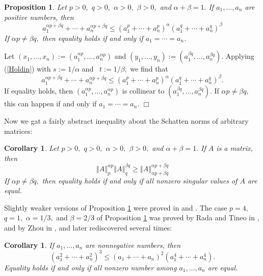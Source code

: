 \documentclass[12pt]{article}%
\newtheorem{corollary}[theorem]{Corollary}
\newtheorem{proposition}[theorem]{Proposition}
\newenvironment{proof}[1][Proof]{\noindent{\textbf {#1}  }}  {\hfill$\Box$\bigskip}
\begin{document}
\begin{proposition}
\label{proP}Let $p>0,$ $q>0,$ $\alpha>0,$ $\beta>0,$ and $\alpha+\beta=1.$ If
$a_{1},\ldots,a_{n}$ are positive numbers, then%
\[
a_{1}^{\alpha p+\beta q}+\cdots+a_{n}^{\alpha p+\beta q}\leq\left(  a_{1}%
^{p}+\cdots+a_{n}^{p}\right)  ^{\alpha}\left(  a_{1}^{q}+\cdots+a_{n}%
^{q}\right)  ^{\beta}%
\]
If $\alpha p\neq\beta q,$ then equality holds if and only if $a_{1}%
=\cdots=a_{n}$.
\end{proposition}

\begin{proof}
Let $\left(  x_{1},\ldots,x_{n}\right)  :=\left(  a_{1}^{\alpha p}%
,\ldots,a_{n}^{\alpha p}\right)  $ and $\left(  y_{1},\ldots,y_{n}\right)
:=(a_{1}^{\beta q},\ldots,a_{n}^{\beta q}).$ Applying (\ref{Holdin}) with
$s:=1/\alpha$ and \ $t:=1/\beta,$ we find that%
\[
a_{1}^{\alpha p+\beta q}+\cdots+a_{n}^{\alpha p+\beta q}\leq\left(  a_{1}%
^{p}+\cdots+a_{n}^{p}\right)  ^{\alpha}\left(  a_{1}^{q}+\cdots+a_{n}%
^{q}\right)  ^{\beta}.
\]
If equality holds, then $\left(  a_{1}^{\alpha p},\ldots,a_{n}^{\alpha
p}\right)  $ is collinear to $(a_{1}^{\beta q},\ldots,a_{n}^{\beta q}).$ If
$\alpha p\neq\beta q,$ this can happen if and only if $a_{1}=\cdots=a_{n}.$
\end{proof}

Now we gat a fairly abstract inequality about the Schatten norms of arbitrary matrices:

\begin{corollary}
\label{proPP}Let $p>0,$ $q>0,$ $\alpha>0,$ $\beta>0,$ and $\alpha+\beta=1.$ If
$A$ is a matrix, then
\[
\left\Vert A\right\Vert _{p}^{\alpha p}\left\Vert A\right\Vert _{q}^{\beta
q}\geq\left\Vert A\right\Vert _{\alpha p+\beta q}^{\alpha p+\beta q}%
\]
If $\alpha p\neq\beta q,$ then equality holds if and only if all nonzero
singular values of $A$ are equal.
\end{corollary}

Slightly weaker versions of Proposition \ref{proP} were proved in \cite{PMR05}
and \cite{ZGPRM07}. The case $p=4,$ $q=1,$ $\alpha=1/3,$ and $\beta=2/3$ of
Proposition \ref{proP} was proved by Rada and Tineo in \cite{RaTi04}, and by
Zhou in \cite{Zho04}, and later rediscovered several times:

\begin{corollary}
If $a_{1},\ldots,a_{n}$ are nonnegative numbers, then%
\[
(a_{1}^{2}+\cdots+a_{n}^{2})^{3}\leq(a_{1}+\cdots+a_{n})^{2}(a_{1}^{4}%
+\cdots+a_{n}^{4}).
\]
Equality holds if and only if all nonzero number among $a_{1},\ldots,a_{n}$
are equal.
\end{corollary}
\end{document}
